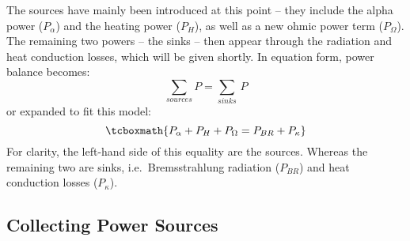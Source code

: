The sources have mainly been introduced at this point -- they include the alpha power ($P_\alpha$)  and the heating power ($P_H$), as well as a new ohmic power term ($P_\Omega$). The remaining two powers -- the sinks -- then appear through the radiation and heat conduction losses, which will be given shortly. In equation form, power balance becomes:
\begin{equation}
	\sum_{sources} P = \sum_{sinks} \, P
\end{equation}
or expanded to fit this model:
\begin{equation}
	\label{eq:power_balance}
	\tcboxmath{
	P_\alpha + P_H + P_\Omega = P_{BR} + P_\kappa
	}
\end{equation}
For clarity, the left-hand side of this equality are the sources. Whereas the remaining two are sinks, i.e.\ Bremsstrahlung radiation ($P_{BR}$) and heat conduction losses ($P_\kappa$).

\subsection{Collecting Power Sources}

